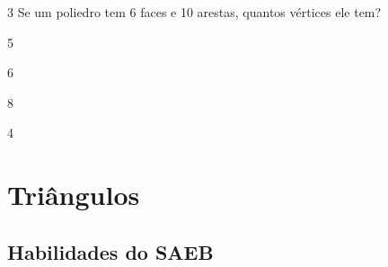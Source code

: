 \num{3} Se um poliedro tem 6 faces e 10 arestas, quantos vértices ele tem?

\begin{escolha}
\item 5
\item 6
\item 8
\item 4
\end{escolha}




\chapter{Triângulos}

\section{Habilidades do SAEB }


